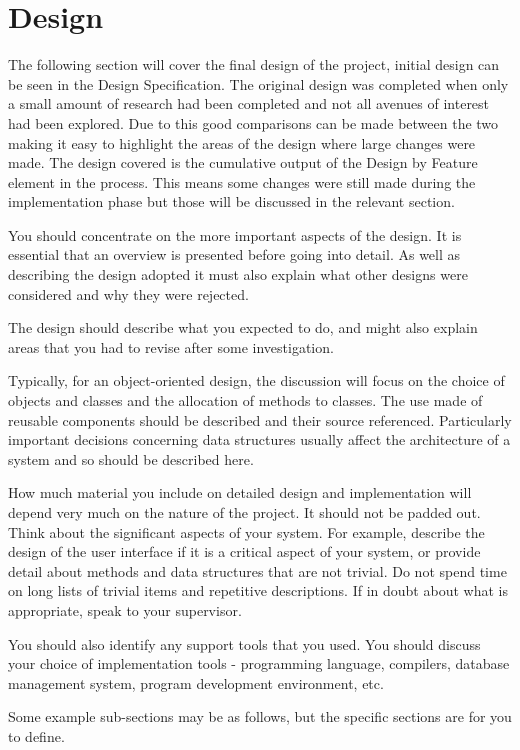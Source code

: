 \chapter{Design}
The following section will cover the final design of the project, initial design can be seen in the Design Specification. The original design was completed when only a small amount of research had been completed and not all avenues of interest had been explored. Due to this good comparisons can be made between the two making it easy to highlight the areas of the design where large changes were made. The design covered is the cumulative output of the Design by Feature element in the process. This means some changes were still made during the implementation phase but those will be discussed in the relevant section.
 
You should concentrate on the more important aspects of the design. It is essential that an overview is presented before going into detail. As well as describing the design adopted it must also explain what other designs were considered and why they were rejected.

The design should describe what you expected to do, and might also explain areas that you had to revise after some investigation.

Typically, for an object-oriented design, the discussion will focus on the choice of objects and classes and the allocation of methods to classes. The use made of reusable components should be described and their source referenced. Particularly important decisions concerning data structures usually affect the architecture of a system and so should be described here.

How much material you include on detailed design and implementation will depend very much on the nature of the project. It should not be padded out. Think about the significant aspects of your system. For example, describe the design of the user interface if it is a critical aspect of your system, or provide detail about methods and data structures that are not trivial. Do not spend time on long lists of trivial items and repetitive descriptions. If in doubt about what is appropriate, speak to your supervisor.
 
You should also identify any support tools that you used. You should discuss your choice of implementation tools - programming language, compilers, database management system, program development environment, etc.

Some example sub-sections may be as follows, but the specific sections are for you to define. 

